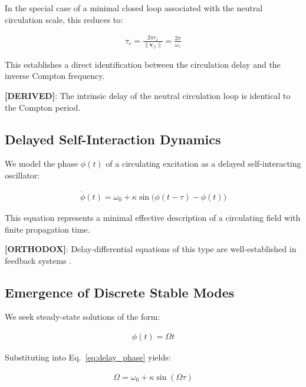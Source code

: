 \documentclass[11pt]{article}
\theoremstyle{definition}
\theoremstyle{plain}
\theoremstyle{remark}
\newcommand{\rc}{{r_c}}
\newcommand{\vnorm}{\lVert \mathbf{v}_{\!\boldsymbol{\circlearrowleft}} \rVert}
\begin{document}
        In the special case of a minimal closed loop associated with the neutral circulation scale, this reduces to:
        
        \begin{align}
            \tau_c = \frac{2\pi \rc}{\vnorm} = \frac{2\pi}{\omega_c}
            \label{eq:compton_delay}
        \end{align}
        
        This establishes a direct identification between the circulation delay and the inverse Compton frequency.
        
        \textbf{[DERIVED]}: The intrinsic delay of the neutral circulation loop is identical to the Compton period.
    
    \subsection{Delayed Self-Interaction Dynamics}
        
        We model the phase $\phi(t)$ of a circulating excitation as a delayed self-interacting oscillator:
        
        \begin{align}
            \dot{\phi}(t) = \omega_0 + \kappa \sin\big(\phi(t - \tau) - \phi(t)\big)
            \label{eq:delay_phase}
        \end{align}
        
        This equation represents a minimal effective description of a circulating field with finite propagation time.
        
        \textbf{[ORTHODOX]}: Delay-differential equations of this type are well-established in feedback systems \cite{SST_delay_basic}.
    
    \subsection{Emergence of Discrete Stable Modes}
        
        We seek steady-state solutions of the form:
        
        \begin{align}
            \phi(t) = \Omega t
        \end{align}
        
        Substituting into Eq.~\ref{eq:delay_phase} yields:
        
        \begin{align}
            \Omega = \omega_0 + \kappa \sin(\Omega \tau)
            \label{eq:mode_condition}
        \end{align}
        
\end{document}
